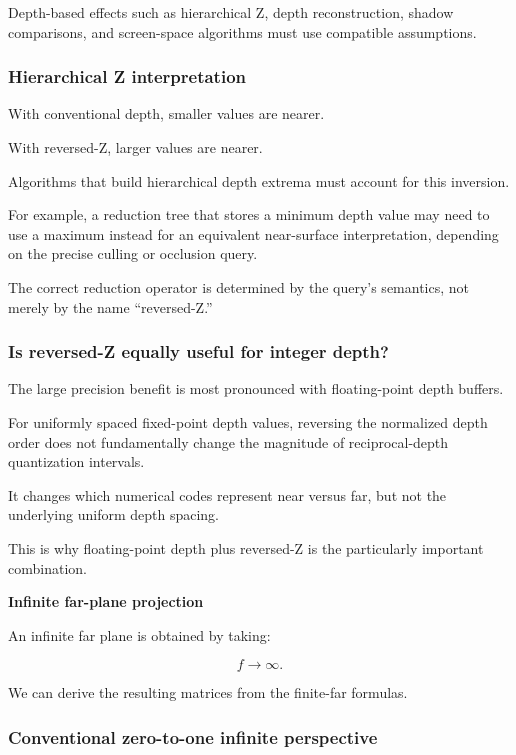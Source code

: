Depth-based effects such as hierarchical Z, depth reconstruction, shadow comparisons, and screen-space algorithms must use compatible assumptions.

\subsubsection{Hierarchical Z interpretation}\label{hierarchical-z-interpretation}

With conventional depth, smaller values are nearer.

With reversed-Z, larger values are nearer.

Algorithms that build hierarchical depth extrema must account for this inversion.

For example, a reduction tree that stores a minimum depth value may need to use a maximum instead for an equivalent near-surface interpretation, depending on the precise culling or occlusion query.

The correct reduction operator is determined by the query's semantics, not merely by the name ``reversed-Z.''

\subsubsection{Is reversed-Z equally useful for integer depth?}\label{is-reversed-z-equally-useful-for-integer-depth}

The large precision benefit is most pronounced with floating-point depth buffers.

For uniformly spaced fixed-point depth values, reversing the normalized depth order does not fundamentally change the magnitude of reciprocal-depth quantization intervals.

It changes which numerical codes represent near versus far, but not the underlying uniform depth spacing.

This is why floating-point depth plus reversed-Z is the particularly important combination. 

\textbf{Infinite far-plane projection}

An infinite far plane is obtained by taking:

\[
 \boxed{f\to\infty}.
\]

We can derive the resulting matrices from the finite-far formulas.

\subsubsection{Conventional zero-to-one infinite perspective}\label{conventional-zero-to-one-infinite-perspective}


